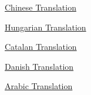               
              
              
                
              
              
              
                \href{http://cs.unm.edu/\textasciitilde{}cliu/WritingBriefly\_by\_pg.htm}{Chinese Translation}


              
            
            
              
            
            
              
            
            
              
                
              
              
              
                \href{http://idp1.blog.hu/}{Hungarian Translation}


              
              
              
                
              
              
              
                \href{http://capalfar.wordpress.com/2007/10/16/traduccions-de-paul-graham-1-writing-briefly/}{Catalan Translation}


              
            
            
              
            
            
              
            
            
              
                
              
              
              
                \href{http://baltzersen.info/articles/writing\_briefly.php}{Danish Translation}


              
              
              
                
              
              
              
                \href{https://tldrarabiccontents.blogspot.com/2020/01/blog-post\_28.html}{Arabic Translation}


              
            
            
              
            
          
